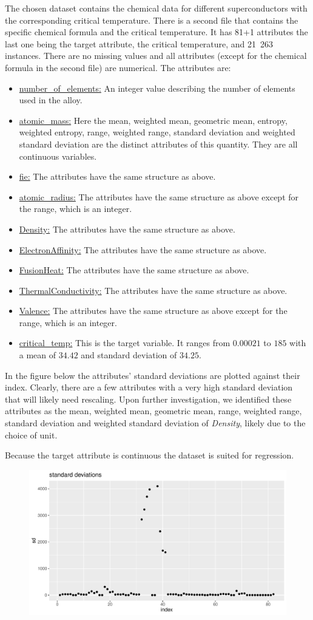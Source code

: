 \documentclass{scrartcl}[a4paper, 11pt]
\begin{document}
The chosen dataset contains the chemical data for different superconductors with the corresponding critical temperature. There is a second file that contains the specific chemical formula and the critical temperature. It has 81+1 attributes the last one being the target attribute, the critical temperature, and 21~263 instances. There are no missing values and all attributes (except for the chemical formula in the second file) are numerical. The attributes are:


\begin{itemize}
    \item \underline{number\_of\_elements:} An integer value describing the number of elements used in the alloy.
    \item \underline{atomic\_mass:} Here the mean, weighted mean, geometric mean, entropy, weighted entropy, range, weighted range, standard deviation and weighted standard deviation are the distinct attributes of this quantity. They are all continuous variables. 
    \item \underline{fie:} The attributes have the same structure as above.
    \item \underline{atomic\_radius:} The attributes have the same structure as above except for the range, which is an integer.
    \item \underline{Density:} The attributes have the same structure as above.
    \item \underline{ElectronAffinity:} The attributes have the same structure as above.
    \item \underline{FusionHeat:} The attributes have the same structure as above.
    \item \underline{ThermalConductivity:} The attributes have the same structure as above.
    \item \underline{Valence:} The attributes have the same structure as above except for the range, which is an integer.
    \item \underline{critical\_temp:} This is the target variable. It ranges from $0.00021$ to $185$ with a mean of $34.42$ and standard deviation of $34.25$.
\end{itemize}

In the figure below the attributes' standard deviations are plotted against their index. Clearly, there are a few attributes with a very high standard deviation that will likely need rescaling. Upon further investigation, we identified these attributes as the mean, weighted mean, geometric mean, range, weighted range, standard deviation and weighted standard deviation of \textit{Density}, likely due to the choice of unit.

Because the target attribute is continuous the dataset is suited for regression.

\begin{figure}[H]
    \centering
    \includegraphics[width=0.8\linewidth]{figures/sd.pdf}
\end{figure}
\end{document}
